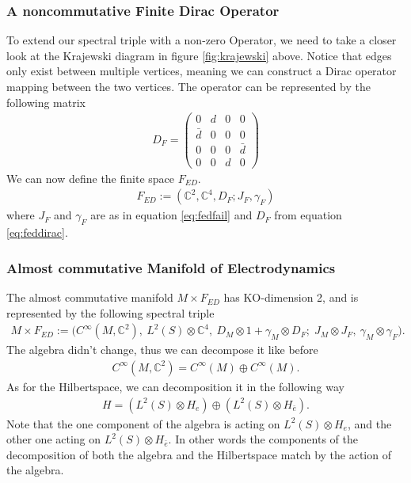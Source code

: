 \subsubsection{A noncommutative Finite Dirac Operator}
To extend our spectral triple with a non-zero Operator, we need to take a
closer look at the Krajewski diagram in figure \ref{fig:krajewski} above. Notice that edges only exist
between multiple vertices, meaning we can construct a Dirac operator mapping
between the two vertices. The operator can be represented by the following matrix
\begin{align}\label{eq:feddirac}
    D_F =
    \begin{pmatrix}
    0 & d & 0 & 0 \\
    \bar{d} & 0 & 0 & 0 \\
    0 & 0 & 0 & \bar{d} \\
    0 & 0 & d & 0
    \end{pmatrix}
\end{align}
We can now define the finite space $F_{ED}$.
\begin{align}
    F_{ED} := (\mathbb{C}^2, \mathbb{C}^4, D_F; J_F, \gamma_F)
\end{align}
where $J_F$ and $\gamma_F$ are as in equation \eqref{eq:fedfail} and $D_F$
from equation \eqref{eq:feddirac}.

\subsubsection{Almost commutative Manifold of Electrodynamics}
The almost commutative manifold $M\times F_{ED}$ has KO-dimension 2, and is
represented by the following spectral triple
\begin{align}\label{eq:almost commutative manifold}
    M\times F_{ED} := \big(C^\infty(M,\mathbb{C}^2),\ L^2(S)\otimes
    \mathbb{C}^4,\
    D_M\otimes 1 +\gamma _M \otimes D_F;\; J_M\otimes J_F,\ \gamma_M\otimes
    \gamma _F\big).
\end{align}
The algebra didn't change, thus we can decompose it like before
\begin{align}
    C^\infty(M, \mathbb{C}^2) = C^\infty (M) \oplus C^\infty (M).
\end{align}
As for the Hilbertspace, we can decomposition it in the following way
\begin{align}
    H = (L^2(S) \otimes H_e ) \oplus (L^2(S) \otimes H_{\bar{e}}).
\end{align}
Note that the one component of the algebra is acting on $L^2(S) \otimes H_e$,
and the other one acting on $L^2(S) \otimes H_{\bar{e}}$. In other words the components of
the decomposition of both the algebra and the Hilbertspace match by the action of
the algebra.

